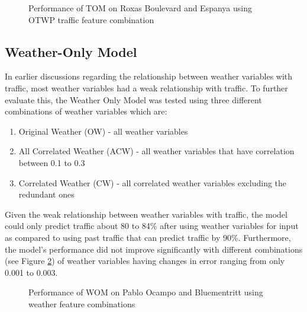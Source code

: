 \begin{figure}
  \centering
  \captionsetup{justification=centering}
  \caption{Performance of TOM on Roxas Boulevard and Espanya using OTWP traffic feature combination}
  \label{fig:tom_feat_combi_road}
\end{figure}



\subsection{Weather-Only Model}
In earlier discussions regarding the relationship between weather variables with traffic, most weather variables had a weak relationship with traffic. To further evaluate this, the Weather Only Model was tested using three different combinations of weather variables which are:

\begin{enumerate}
\item Original Weather (OW) - all weather variables
\item All Correlated Weather (ACW) - all weather variables that have correlation between 0.1 to 0.3
\item Correlated Weather (CW) - all correlated weather variables excluding the redundant ones
\end{enumerate}

Given the weak relationship between weather variables with traffic, the model could only predict traffic about 80 to 84\% after using weather variables for input as compared to using past traffic that can predict traffic by 90\%. Furthermore, the model’s performance did not improve significantly with different combinations (see Figure \ref{fig:wom_diff_feat_combi}) of weather variables having changes in error ranging from only 0.001 to 0.003. 

\begin{figure}
  \centering
  \captionsetup{justification=centering}
  \caption{Performance of WOM on Pablo Ocampo and Bluementritt using weather feature combinations}
  \label{fig:wom_diff_feat_combi}
\end{figure}

